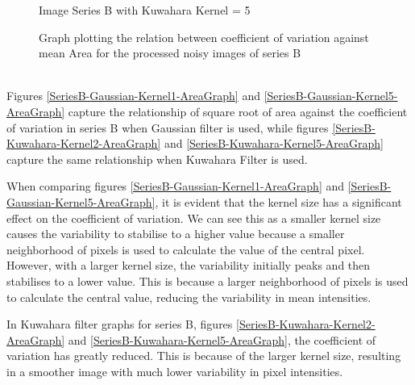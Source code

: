 \documentclass[runningheads]{llncs}
\begin{document}
\begin{figure}[h!]
\begin{minipage}[h]{0.47\linewidth}
\begin{center}
\caption{Image Series B with Kuwahara Kernel = 5}
\label{SeriesB-Kuwahara-Kernel5-AreaGraph}
\end{center}
\end{minipage}
\caption*{ Graph plotting the relation between coefficient of variation against mean Area for the processed noisy images of series B}
\label{SeriesB-Gaussian/Kuwahara-AreaGraph}
\end{figure}

~\\ Figures \ref{SeriesB-Gaussian-Kernel1-AreaGraph} and \ref{SeriesB-Gaussian-Kernel5-AreaGraph} capture the relationship of square root of area against the coefficient of variation in series B when Gaussian filter is used, while figures \ref{SeriesB-Kuwahara-Kernel2-AreaGraph} and \ref{SeriesB-Kuwahara-Kernel5-AreaGraph} capture the same relationship when Kuwahara Filter is used. 
\par When comparing figures \ref{SeriesB-Gaussian-Kernel1-AreaGraph} and \ref{SeriesB-Gaussian-Kernel5-AreaGraph}, it is evident that the kernel size has a significant effect on the coefficient of variation. We can see this as a smaller kernel size causes the variability to stabilise to a higher value because a smaller neighborhood of pixels is used to calculate the value of the central pixel.  However, with a larger kernel size, the variability initially peaks and then stabilises to a lower value. This is because a larger neighborhood of pixels is used to calculate the central value, reducing the variability in mean intensities. %
\par In Kuwahara filter graphs for series B, figures \ref{SeriesB-Kuwahara-Kernel2-AreaGraph} and \ref{SeriesB-Kuwahara-Kernel5-AreaGraph}, the coefficient of variation has greatly reduced. This is because of the larger kernel size, resulting in a smoother image with much lower variability in pixel intensities.  
\end{document}
